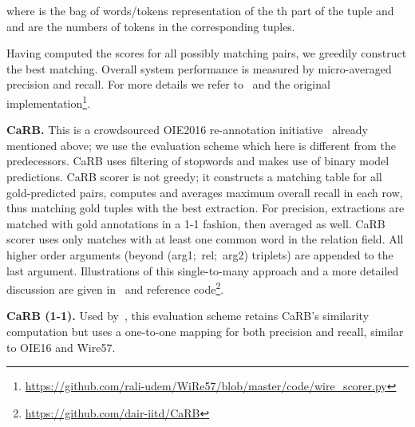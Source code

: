 \documentclass[letterpaper]{article} \usepackage{aaai22}  \usepackage{times}  \usepackage{helvet}  \usepackage{courier}  \usepackage[hyphens]{url}  \usepackage{graphicx} \usepackage{placeins}
\begin{document}
where  is the bag of words/tokens representation of the th part of the tuple and  and  are the numbers of tokens in the corresponding tuples.

Having computed the scores for all possibly matching pairs, we greedily construct the best matching. Overall system performance is measured by micro-averaged precision and recall. For more details we refer to~\cite{lechelle2019wire57} and the original implementation\footnote{\url{https://github.com/rali-udem/WiRe57/blob/master/code/wire_scorer.py}}.

\textbf{CaRB.} This is a crowdsourced OIE2016 re-annotation initiative~\cite{bhardwaj-etal-2019-carb} already mentioned above; we use the evaluation scheme which here is different from the predecessors. CaRB uses filtering of stopwords and makes use of binary model predictions. 
CaRB scorer is not greedy; it constructs a matching table for all gold-predicted pairs, computes and averages maximum overall recall in each row, thus matching gold tuples with the best extraction. For precision, extractions are matched with gold annotations in a 1-1 fashion, then averaged as well. 
CaRB scorer uses only matches with at least one common word in the relation field. All higher order arguments (beyond (arg1;~rel;~arg2) triplets) are appended to the last argument. Illustrations of this single-to-many approach and a more detailed discussion are given in~\cite{bhardwaj-etal-2019-carb} and reference code\footnote{\url{https://github.com/dair-iitd/CaRB}}.

\textbf{CaRB (1-1).} Used by~\citet{kolluru2020openie6}, this evaluation scheme retains CaRB's similarity computation but uses a one-to-one mapping for both precision and recall, similar to OIE16 and Wire57.
\end{document}
